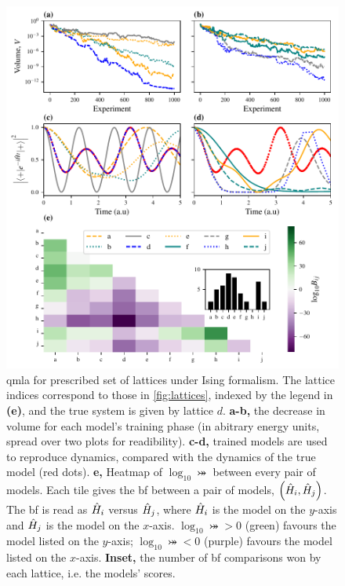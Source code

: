 \begin{figure}
    \begin{center}
        \includegraphics{theoretical_study/figures/lattice_qmla_summary.pdf}
    \end{center}
    \caption[QMLA for prescribed set of lattices under Ising formalism]{
        \gls{qmla} for prescribed set of lattices under Ising formalism. 
        The lattice indices correspond to those in \cref{fig:lattices},
            indexed by the legend in \textbf{(e)},  
            and the true system is given by lattice $d$. 
        \textbf{a-b,} the decrease in \gls{volume} for each model's training phase 
            (in abitrary energy units, spread over two plots for readibility).
        \textbf{c-d,} trained models are used to reproduce dynamics, compared with the dynamics of the
            \gls{true model} (red dots). 
        \textbf{e,} Heatmap of $\log_{10} \bij$ between every pair of models. 
        Each tile gives the \gls{bf} between a pair of models, $\left(\hat{H}_i, \hat{H}_j\right)$. 
        The \gls{bf} is read as 
        $\hat{H}_i$ versus $\hat{H}_j$, where $\hat{H}_i$ is the model on the $y$-axis and $\hat{H}_j$ is the model on the $x$-axis. 
        $\log_{10} \bij > 0$ (green) favours the model listed on the $y$-axis;
        $\log_{10} \bij < 0$ (purple) favours the model listed on the $x$-axis.
        \textbf{Inset,} the number of \gls{bf} comparisons won by each lattice, i.e. the models' scores. 
        \figtableref
    }
    \label{fig:lattice_qmla_eg}
\end{figure}    

